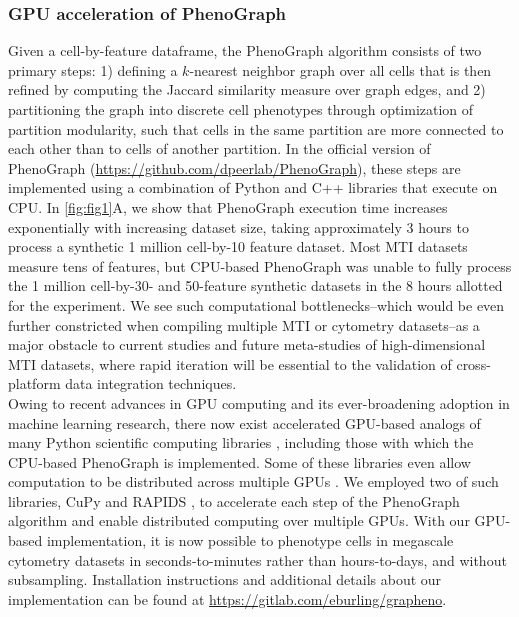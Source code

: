 \documentclass[preprint,review,3p,12pt]{elsarticle}
\begin{document}
\subsubsection{GPU acceleration of PhenoGraph}
Given a cell-by-feature dataframe, the PhenoGraph algorithm \cite{Levine2015} consists of two primary steps: 1) defining a $k$-nearest neighbor graph over all cells that is then refined by computing the Jaccard similarity measure over graph edges, and 2) partitioning the graph into discrete cell phenotypes through optimization of partition modularity, such that cells in the same partition are more connected to each other than to cells of another partition. In the official version of PhenoGraph (\url{https://github.com/dpeerlab/PhenoGraph}), these steps are implemented using a combination of Python and C++ libraries that execute on CPU. In \autoref{fig:fig1}A, we show that PhenoGraph execution time increases exponentially with increasing dataset size, taking approximately 3 hours to process a synthetic 1 million cell-by-10 feature dataset. Most MTI datasets measure tens of features, but CPU-based PhenoGraph was unable to fully process the 1 million cell-by-30- and 50-feature synthetic datasets in the 8 hours allotted for the experiment. We see such computational bottlenecks--which would be even further constricted when compiling multiple MTI or cytometry datasets--as a major obstacle to current studies and future meta-studies of high-dimensional MTI datasets, where rapid iteration will be essential to the validation of cross-platform data integration techniques. \\

Owing to recent advances in GPU computing and its ever-broadening adoption in machine learning research, there now exist accelerated GPU-based analogs of many Python scientific computing libraries \cite{cupy2017,cuml2020}, including those with which the CPU-based PhenoGraph is implemented. Some of these libraries even allow computation to be distributed across multiple GPUs \cite{cuml2020,dask}. We employed two of such libraries, CuPy \cite{cupy2017} and RAPIDS \cite{cuml2020}, to accelerate each step of the PhenoGraph algorithm and enable distributed computing over multiple GPUs. With our GPU-based implementation, it is now possible to phenotype cells in megascale cytometry datasets in seconds-to-minutes rather than hours-to-days, and without subsampling. Installation instructions and additional details about our implementation can be found at \url{https://gitlab.com/eburling/grapheno}.\\
\end{document}
